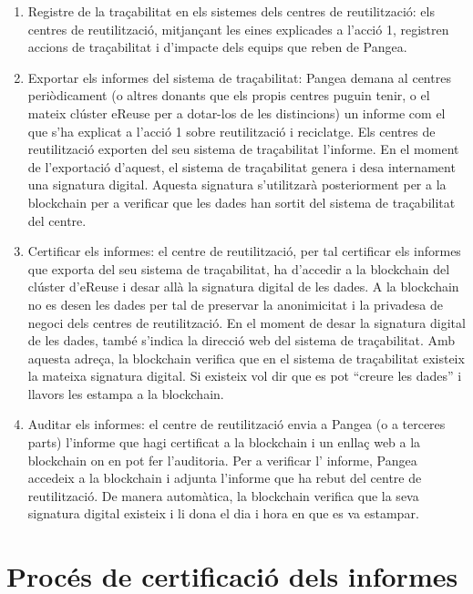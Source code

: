 \documentclass[
]{book}
\begin{document}
\begin{enumerate}
\def\labelenumi{\arabic{enumi}.}
\item
  Registre de la traçabilitat en els sistemes dels centres de reutilització: els centres de reutilització, mitjançant les eines explicades a l'acció 1, registren accions de traçabilitat i d'impacte dels equips que reben de Pangea.
\item
  Exportar els informes del sistema de traçabilitat: Pangea demana al centres periòdicament (o altres donants que els propis centres puguin tenir, o el mateix clúster eReuse per a dotar-los de les distincions) un informe com el que s'ha explicat a l'acció 1 sobre reutilització i reciclatge. Els centres de reutilització exporten del seu sistema de traçabilitat l'informe. En el moment de l'exportació d'aquest, el sistema de traçabilitat genera i desa internament una signatura digital. Aquesta signatura s'utilitzarà
  posteriorment per a la blockchain per a verificar que les dades han sortit del sistema de traçabilitat del centre.
\item
  Certificar els informes: el centre de reutilització, per tal certificar els informes que exporta del seu sistema de traçabilitat, ha d'accedir a la blockchain del clúster d'eReuse i desar allà la signatura digital de les dades. A la blockchain no es desen les
  dades per tal de preservar la anonimicitat i la privadesa de negoci dels centres de reutilització. En el moment de desar la signatura digital de les dades, també s'indica la direcció web del sistema de traçabilitat. Amb aquesta adreça, la blockchain verifica que
  en el sistema de traçabilitat existeix la mateixa signatura digital. Si existeix vol dir que es pot ``creure les dades'' i llavors les estampa a la blockchain.
\item
  Auditar els informes: el centre de reutilització envia a Pangea (o a terceres parts) l'informe que hagi certificat a la blockchain i un enllaç web a la blockchain on en pot fer l'auditoria. Per a verificar l' informe, Pangea accedeix a la blockchain i adjunta l'informe que ha rebut del centre de reutilització. De manera automàtica, la blockchain verifica que la seva signatura digital existeix i li dona el dia i hora en que es va estampar.
\end{enumerate}

\hypertarget{procuxe9s-de-certificaciuxf3-dels-informes}{%
\section{Procés de certificació dels informes}\label{procuxe9s-de-certificaciuxf3-dels-informes}}
\end{document}
